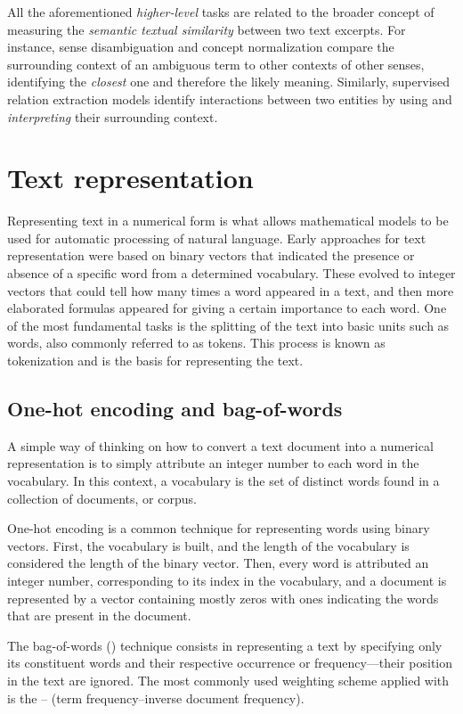 All the aforementioned \textit{higher-level} tasks are related to the broader concept of measuring the \textit{semantic textual similarity} between two text excerpts.
For instance, sense disambiguation and concept normalization compare the surrounding context of an ambiguous term to other contexts of other senses, identifying the \textit{closest} one and therefore the likely meaning.
Similarly, supervised relation extraction models identify interactions between two entities by using and \textit{interpreting} their surrounding context.


\section{Text representation}

Representing text in a numerical form is what allows mathematical models to be used for automatic processing of natural language.
Early approaches for text representation were based on binary vectors that indicated the presence or absence of a specific word from a determined vocabulary. These evolved to integer vectors that could tell how many times a word appeared in a text, and then more elaborated formulas appeared for giving a certain importance to each word.
One of the most fundamental  tasks is the splitting of the text into basic units such as words, also commonly referred to as tokens.
This process is known as tokenization and is the basis for representing the text.


\subsection{One-hot encoding and bag-of-words}

A simple way of thinking on how to convert a text document into a numerical representation is to simply attribute an integer number to each word in the vocabulary.
In this context, a vocabulary is the set of distinct words found in a collection of documents, or corpus.

One-hot encoding is a common technique for representing words using binary vectors.
First, the vocabulary is built, and the length of the vocabulary is considered the length of the binary vector.
Then, every word is attributed an integer number, corresponding to its index in the vocabulary, and a document is represented by a vector containing mostly zeros with ones indicating the words that are present in the document.

The bag-of-words () technique consists in representing a text by specifying only its constituent words and their respective occurrence or frequency---their position in the text are ignored.
The most commonly used weighting scheme applied with  is the -- (term frequency--inverse document frequency).

